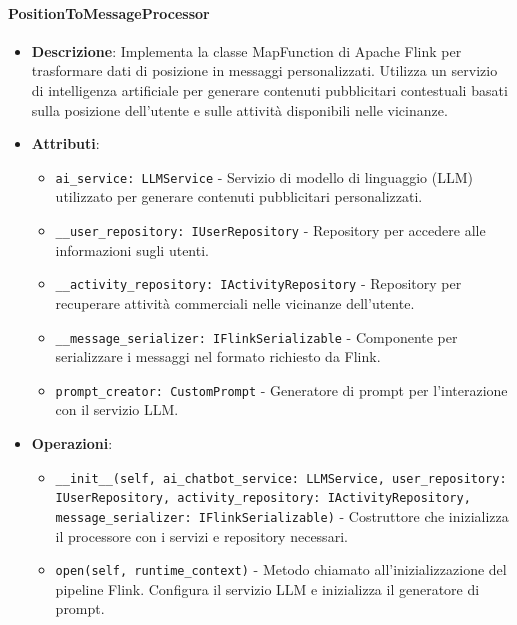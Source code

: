 \documentclass[10pt]{article}
\begin{document}
    \paragraph{PositionToMessageProcessor}
    \begin{itemize} 
    \item \textbf{Descrizione}: Implementa la classe MapFunction di Apache Flink per trasformare dati di posizione in messaggi personalizzati. Utilizza un servizio di intelligenza artificiale per generare contenuti pubblicitari contestuali basati sulla posizione dell'utente e sulle attività disponibili nelle vicinanze.
    \item \textbf{Attributi}:
    \begin{itemize}
        \item \texttt{ai\_service: LLMService} - Servizio di modello di linguaggio (LLM) utilizzato per generare contenuti pubblicitari personalizzati.
        \item \texttt{\_\_user\_repository: IUserRepository} - Repository per accedere alle informazioni sugli utenti.
        \item \texttt{\_\_activity\_repository: IActivityRepository} - Repository per recuperare attività commerciali nelle vicinanze dell'utente.
        \item \texttt{\_\_message\_serializer: IFlinkSerializable} - Componente per serializzare i messaggi nel formato richiesto da Flink.
        \item \texttt{prompt\_creator: CustomPrompt} - Generatore di prompt per l'interazione con il servizio LLM.
    \end{itemize}
    
    \item \textbf{Operazioni}:
    \begin{itemize}
        \item \texttt{\_\_init\_\_(self, ai\_chatbot\_service: LLMService, user\_repository: IUserRepository, activity\_repository: IActivityRepository, message\_serializer: IFlinkSerializable)} - Costruttore che inizializza il processore con i servizi e repository necessari.
        
        \item \texttt{open(self, runtime\_context)} - Metodo chiamato all'inizializzazione del pipeline Flink. Configura il servizio LLM e inizializza il generatore di prompt.
        

\end{itemize}
\end{itemize}
\end{document}

